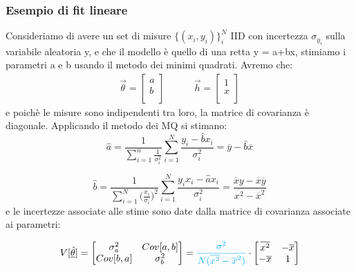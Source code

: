 \subsubsection{Esempio di fit lineare}

Consideriamo di avere un set di misure $\{(x_i,y_i) \}_{i}^N$ IID con incertezza $\sigma_{y_{i}}$ sulla variabile aleatoria y, e che il modello \`{e} quello di una retta y = a+bx, stimiamo i parametri a e b usando il metodo dei minimi quadrati. Avremo che:
\begin{align*}
\vec{\theta} =
	\begin{bmatrix}
		a \\
		b \\ 
	\end{bmatrix}
	\quad \quad \quad\vec{h}=
	\begin{bmatrix}
		1 \\
		x \\
	\end{bmatrix}
\end{align*}
e poich\`{e} le misure sono indipendenti tra loro, la matrice di covarianza \`{e} diagonale. Applicando il metodo dei MQ si stimano:
\begin{equation*}
	\hat{a} = \dfrac{1}{\sum_{i=1}^n \frac{1}{\sigma_i^2}}\sum_{i=1}^N \dfrac{y_i -\hat{b}x_i}{\sigma_i^2} = \overline{y} - \hat{b} \overline{x}
\end{equation*}

\begin{equation*}
	\hat{b} = \dfrac{1}{\sum_{i=1}^N \big (\frac{x_i}{\sigma_i} \big )^2}\sum_{i=1}^N \dfrac{y_ix_i -\hat{a}x_i}{\sigma_i^2} = \dfrac{\overline xy -\overline{x}\overline{y}}{\overline{x^2} - \overline{x}^2}
\end{equation*}
\newline
e le incertezze associate alle stime sono date dalla matrice di covarianza associate ai parametri:

\begin{align*}
V[\underline{\hat{\theta}}]=
	\begin{bmatrix}
		\sigma^2_{a} & Cov[a,b] \\
		Cov[b,a] & \sigma^2_{b} \\
	\end{bmatrix}
	= \textcolor{cyan}{\dfrac{\sigma^2}{N(\overline{x^2} - \overline{x}^2 )}} \cdot 
	\begin{bmatrix}
		\overline{x^2} & - \overline{x} \\
		- \overline{x} & 1 \\
	\end{bmatrix}
\end{align*} 

